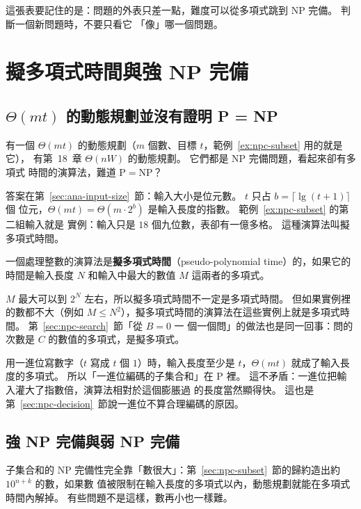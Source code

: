 這張表要記住的是：問題的外表只差一點，難度可以從多項式跳到 NP 完備。 判斷一個新問題時，不要只看它
「像」哪一個問題。

\section{擬多項式時間與強 NP 完備}
\label{sec:npc-pseudo}

\subsection{\texorpdfstring{$\Theta(mt)$}{Θ(mt)} 的動態規劃並沒有證明 P = NP}

 有一個 $\Theta(mt)$ 的動態規劃（$m$ 個數、目標 $t$，範例~\ref{ex:npc-subset} 用的就是
它）， 有第~18~章 $\Theta(nW)$ 的動態規劃。 它們都是 NP 完備問題，看起來卻有多項式
時間的演算法，難道 $\mathrm{P} = \mathrm{NP}$？

答案在第~\ref{sec:ana-input-size}~節：輸入大小是位元數。 $t$ 只占 $b = \lceil \lg(t + 1) \rceil$ 個
位元，$\Theta(mt) = \Theta(m \cdot 2^b)$ 是輸入長度的指數。 範例~\ref{ex:npc-subset} 的第二組輸入就是
實例：輸入只是 $18$ 個九位數，表卻有一億多格。 這種演算法叫擬多項式時間。

\begin{definition}[擬多項式時間]
\label{def:npc-pseudo}
一個處理整數的演算法是\textbf{擬多項式時間}（pseudo-polynomial time）的，如果它的時間是輸入長度 $N$
和輸入中最大的數值 $M$ 這兩者的多項式。
\end{definition}

$M$ 最大可以到 $2^N$ 左右，所以擬多項式時間不一定是多項式時間。 但如果實例裡的數都不大（例如 $M \le
N^2$），擬多項式時間的演算法在這些實例上就是多項式時間。 第~\ref{sec:npc-search}~節「從 $B = 0$ 一
個一個問」的做法也是同一回事：問的次數是 $C$ 的數值的多項式，是擬多項式。

用一進位寫數字（$t$ 寫成 $t$ 個 $1$）時，輸入長度至少是 $t$，$\Theta(mt)$ 就成了輸入長度的多項式。
所以「一進位編碼的子集合和」在 P 裡。 這不矛盾：一進位把輸入灌大了指數倍，演算法相對於這個膨脹過
的長度當然顯得快。 這也是第~\ref{sec:npc-decision}~節說一進位不算合理編碼的原因。

\subsection{強 NP 完備與弱 NP 完備}

子集合和的 NP 完備性完全靠「數很大」：第~\ref{sec:npc-subset}~節的歸約造出約 $10^{n+k}$ 的數，如果數
值被限制在輸入長度的多項式以內，動態規劃就能在多項式時間內解掉。 有些問題不是這樣，數再小也一樣難。

